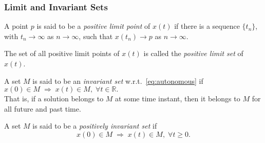 \begin{frame}
    \frametitle{Limit and Invariant Sets}

    \begin{definition}
        A point $p$ is said to be a \textit{positive limit point} of $x(t)$ if 
        there is a sequence $\{t_n\}$, with $t_n \to \infty$ as $n \to \infty$, 
        such that $x(t_n) \to p$ as $n \to \infty$.

        The set of all positive limit points of $x(t)$ is called the
        \textit{positive limit set} of $x(t)$.
    \end{definition}

    \begin{definition}
        A set $M$ is said to be an \textit{invariant set}
        w.r.t.~\eqref{eq:autonomous} if\\[0.5ex] \hspace{29mm} $ x(0) \in M \;
        \Rightarrow \; x(t) \in M, \; \forall t \in \mathbb{R}. $\\[0.5ex] That
        is, if a solution belongs to $M$
        at some time instant, then it belongs to $M$ for all future and past
        time.

        A set $M$ is said to be a \textit{positively invariant set} if 
        \[ x(0) \in M \; \Rightarrow \; x(t) \in M, \; \forall t \geq 0. \]
    \end{definition}
\end{frame}


